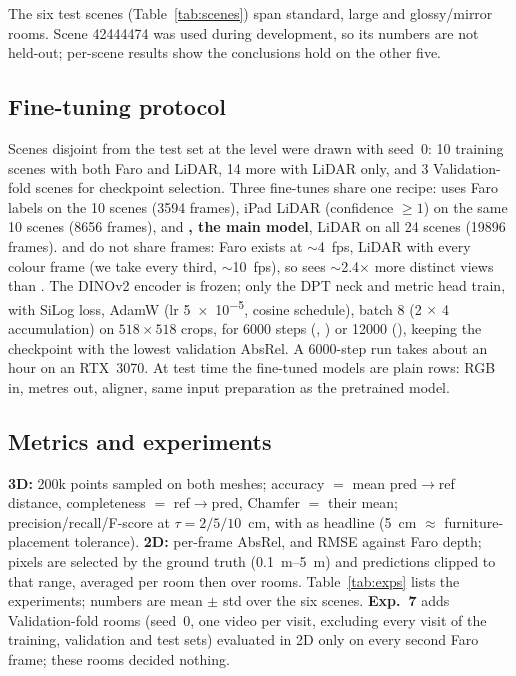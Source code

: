The six test scenes (Table~\ref{tab:scenes}) span standard, large and glossy/mirror rooms. Scene 42444474 was used
during development, so its numbers are not held-out; per-scene results show the conclusions hold on the other five.

\subsection{Fine-tuning protocol}\label{sec:ftsetup}
Scenes disjoint from the test set at the  level were drawn with seed~0: 10 training scenes with both
Faro and LiDAR, 14 more with LiDAR only, and 3 Validation-fold scenes for checkpoint selection. Three fine-tunes share
one recipe: \textbf{\ftfaro{}} uses Faro labels on the 10 scenes (\num{3594} frames), \textbf{\ftlidar{}} iPad LiDAR (confidence
$\geq 1$) on the same 10 scenes (\num{8656} frames), and \textbf{\ftmain{}, the main model}, LiDAR on all 24 scenes
(\num{19896} frames). \ftfaro{} and \ftlidar{} do not share frames: Faro exists at $\sim$4~fps, LiDAR with every colour frame (we take
every third, $\sim$10~fps), so \ftlidar{} sees $\sim$2.4$\times$ more distinct views than \ftfaro{}. The DINOv2 encoder is frozen;
only the DPT neck and metric head train, with SiLog loss, AdamW (lr \num{5e-5}, cosine schedule), batch 8 (2 $\times$
4 accumulation) on $518\times518$ crops, for \num{6000} steps (\ftfaro{}, \ftlidar{}) or \num{12000} (\ftmain{}), keeping the checkpoint with
the lowest validation AbsRel. A \num{6000}-step run takes about an hour on an RTX~3070. At test time the fine-tuned
models are plain  rows: RGB in, metres out,  aligner, same input preparation as the
pretrained model.

\subsection{Metrics and experiments}\label{sec:metrics}
\textbf{3D:} 200k points sampled on both meshes; accuracy $=$ mean pred$\rightarrow$ref distance, completeness $=$
ref$\rightarrow$pred, Chamfer $=$ their mean; precision/recall/F-score at $\tau=2/5/10$~cm, with \fscore{} as
headline (\SI{5}{cm} $\approx$ furniture-placement tolerance). \textbf{2D:} per-frame AbsRel, \wone{} and RMSE
against Faro depth; pixels are selected by the ground truth (\SIrange{0.1}{5}{m}) and predictions clipped to that
range, averaged per room then over rooms. Table~\ref{tab:exps} lists the experiments; numbers are mean $\pm$ std over
the six scenes. \textbf{Exp.~7} adds \rsVN{} Validation-fold rooms (seed~0, one video per visit, excluding every visit
of the training, validation and test sets) evaluated in 2D only on every second Faro frame; these rooms decided nothing.

